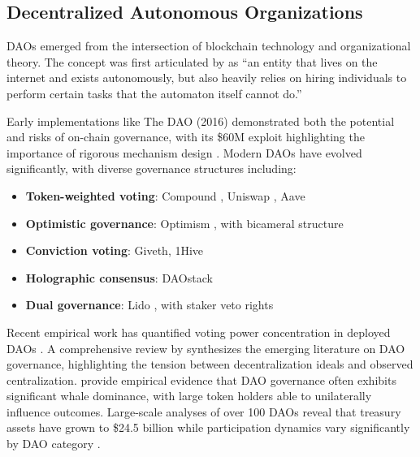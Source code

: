 
\subsection{Decentralized Autonomous Organizations}

DAOs emerged from the intersection of blockchain technology and organizational theory. The concept was first articulated by \citet{buterin2014dao} as ``an entity that lives on the internet and exists autonomously, but also heavily relies on hiring individuals to perform certain tasks that the automaton itself cannot do.''

Early implementations like The DAO (2016) demonstrated both the potential and risks of on-chain governance, with its \$60M exploit highlighting the importance of rigorous mechanism design \citep{dhillon2017dao}. Modern DAOs have evolved significantly, with diverse governance structures including:

\begin{itemize}
    \item \textbf{Token-weighted voting}: Compound \citep{compound2020governance}, Uniswap \citep{uniswap2021governance}, Aave \citep{aave2020governance}
    \item \textbf{Optimistic governance}: Optimism \citep{optimism2022governance}, with bicameral structure
    \item \textbf{Conviction voting}: Giveth, 1Hive \citep{emmett2019conviction}
    \item \textbf{Holographic consensus}: DAOstack \citep{daostack2019holographic}
    \item \textbf{Dual governance}: Lido \citep{lido2022dualgovernance}, with staker veto rights
\end{itemize}

Recent empirical work has quantified voting power concentration in deployed DAOs \citep{fritsch2022analyzing, fritsch2024voting}. A comprehensive review by \citet{han2025review} synthesizes the emerging literature on DAO governance, highlighting the tension between decentralization ideals and observed centralization. \citet{cong2025centralized} provide empirical evidence that DAO governance often exhibits significant whale dominance, with large token holders able to unilaterally influence outcomes. Large-scale analyses of over 100 DAOs reveal that treasury assets have grown to \$24.5 billion while participation dynamics vary significantly by DAO category \citep{nabben2024future}.


